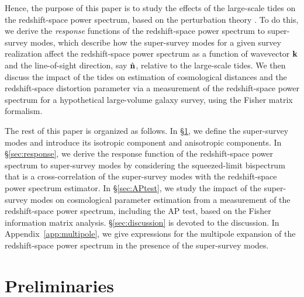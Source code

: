 \documentclass[prd,onecolumn,notitlepage,amsmath,amssymb,floatfix,superscriptaddress]{revtex4-1}
\newcommand{\bk}{{\bf k}}
\newcommand{\bn}{{\bf n}}
\begin{document}
Hence, the purpose of this paper is to study the effects of the large-scale tides on the redshift-space power spectrum, based on the perturbation theory \citep{Bernardeauetal:02}. To do this, we derive the {\em response} functions of the redshift-space power spectrum to
super-survey modes, which describe how the super-survey modes for a given survey realization affect the redshift-space power spectrum as a function of wavevector $\bk$ and the line-of-sight direction, say $\hat{\bn}$, relative to the large-scale tides.
We then discuss the impact of the tides on estimation of cosmological distances and the redshift-space distortion parameter via a measurement of the redshift-space power spectrum for a hypothetical large-volume galaxy survey, using the Fisher matrix formalism.

The rest of this paper is organized as follows. In \S\ref{sec:preliminaries}, we define the super-survey modes and introduce its 
isotropic component and anisotropic components.
In \S\ref{sec:response}, we derive the response function of the redshift-space power spectrum to super-survey modes by considering the squeezed-limit bispectrum that is a cross-correlation of the super-survey modes with the redshift-space power spectrum estimator. 
In \S\ref{sec:APtest}, we study the impact of the super-survey modes on cosmological parameter estimation from a measurement of the redshift-space power spectrum, including the AP test, 
based on the Fisher information matrix analysis.
\S\ref{sec:discussion} is devoted to the discussion.
In Appendix~\ref{app:multipole}, we give expressions for the multipole expansion of the 
redshift-space power spectrum in the presence of the super-survey modes.


\section{Preliminaries}
\label{sec:preliminaries}
\end{document}
